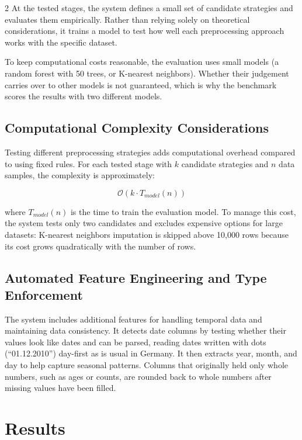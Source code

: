 \documentclass[11pt,a4paper]{article}
\begin{document}
\begin{multicols}{2}
At the tested stages, the system defines a small set of candidate strategies and evaluates them empirically. Rather than relying solely on theoretical considerations, it trains a model to test how well each preprocessing approach works with the specific dataset.

To keep computational costs reasonable, the evaluation uses small models (a random forest with 50 trees, or K-nearest neighbors). Whether their judgement carries over to other models is not guaranteed, which is why the benchmark scores the results with two different models.

\subsection{Computational Complexity Considerations}

Testing different preprocessing strategies adds computational overhead compared to using fixed rules. For each tested stage with $k$ candidate strategies and $n$ data samples, the complexity is approximately:

\[
\mathcal{O}(k \cdot T_{model}(n))
\]

where $T_{model}(n)$ is the time to train the evaluation model. To manage this cost, the system tests only two candidates and excludes expensive options for large datasets: K-nearest neighbors imputation is skipped above 10,000 rows because its cost grows quadratically with the number of rows.

\subsection{Automated Feature Engineering and Type Enforcement}

The system includes additional features for handling temporal data and maintaining data consistency. It detects date columns by testing whether their values look like dates and can be parsed, reading dates written with dots (``01.12.2010'') day-first as is usual in Germany. It then extracts year, month, and day to help capture seasonal patterns. Columns that originally held only whole numbers, such as ages or counts, are rounded back to whole numbers after missing values have been filled.


\section{Results}
\label{sec:results}


\end{multicols}
\end{document}
